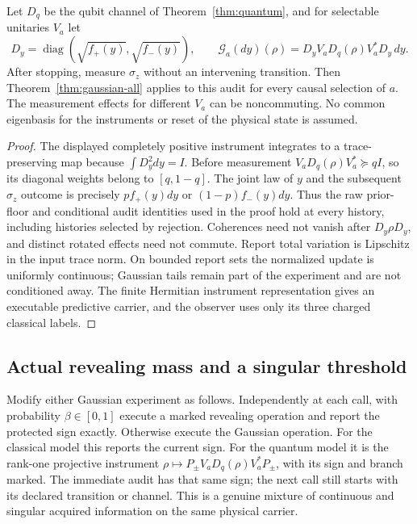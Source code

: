 \begin{proposition}\label{prop:gaussian-quantum}
Let $D_q$ be the qubit channel of Theorem~\ref{thm:quantum}, and for selectable unitaries $V_a$ let
\[
 D_y=\operatorname{diag}(\sqrt{f_+(y)},\sqrt{f_-(y)}),\qquad
 \mathcal G_a(dy)(\rho)=D_yV_aD_q(\rho)V_a^*D_y\,dy.
\]
After stopping, measure $\sigma_z$ without an intervening transition. Then Theorem~\ref{thm:gaussian-all} applies to this audit for every causal selection of $a$. The measurement effects for different $V_a$ can be noncommuting. No common eigenbasis for the instruments or reset of the physical state is assumed.
\end{proposition}
\begin{proof}
The displayed completely positive instrument integrates to a trace-preserving map because $\int D_y^2dy=I$. Before measurement $V_aD_q(\rho)V_a^*\succeq qI$, so its diagonal weights belong to $[q,1-q]$. The joint law of $y$ and the subsequent $\sigma_z$ outcome is precisely $pf_+(y)dy$ or $(1-p)f_-(y)dy$. Thus the raw prior-floor and conditional audit identities used in the proof hold at every history, including histories selected by rejection. Coherences need not vanish after $D_y\rho D_y$, and distinct rotated effects need not commute. Report total variation is Lipschitz in the input trace norm. On bounded report sets the normalized update is uniformly continuous; Gaussian tails remain part of the experiment and are not conditioned away. The finite Hermitian instrument representation gives an executable predictive carrier, and the observer uses only its three charged classical labels.
\end{proof}

\subsection{Actual revealing mass and a singular threshold}
Modify either Gaussian experiment as follows. Independently at each call, with probability $\beta\in[0,1]$ execute a marked revealing operation and report the protected sign exactly. Otherwise execute the Gaussian operation. For the classical model this reports the current sign. For the quantum model it is the rank-one projective instrument $\rho\mapsto P_\pm V_aD_q(\rho)V_a^*P_\pm$, with its sign and branch marked. The immediate audit has that same sign; the next call still starts with its declared transition or channel. This is a genuine mixture of continuous and singular acquired information on the same physical carrier.

